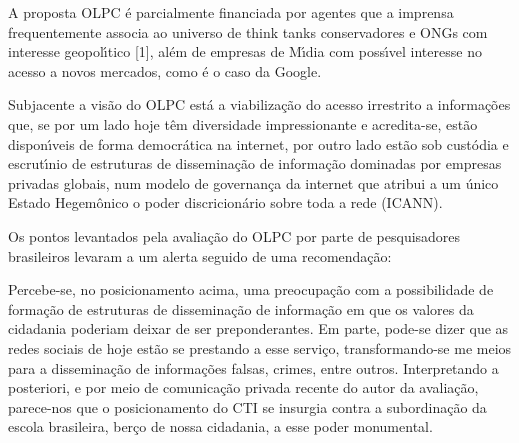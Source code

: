 \documentclass[
12pt,		%
openright,	%
twoside,  %
a4paper,			%
chapter=TITLE,		%
english,			%
french,				%
spanish,			%
brazil				%
]{USPSC-classe/USPSC}
\begin{document}
\begin{alineas}
\item \textquotedbl A proposta OLPC \'e parcialmente financiada por agentes que a imprensa frequentemente associa ao universo de think tanks conservadores e ONGs com interesse geopol\'{\i}tico [1], al\'em de empresas de M\'{\i}dia com poss\'{\i}vel interesse no acesso a novos mercados, como \'e o caso da Google.\textquotedbl 
\item \textquotedbl Subjacente a vis\~ao do OLPC est\'a a viabiliza\c{c}\~ao do acesso irrestrito a informa\c{c}\~oes que, se por um lado hoje t\^em diversidade impressionante e acredita-se, est\~ao dispon\'{\i}veis de forma democr\'atica na internet, por outro lado est\~ao sob cust\'odia e escrut\'{\i}nio de estruturas de dissemina\c{c}\~ao de informa\c{c}\~ao dominadas por empresas privadas globais, num modelo de governan\c{c}a da internet que atribui a um \'unico Estado Hegem\^onico o poder discricion\'ario sobre toda a rede (ICANN).\textquotedbl 
\end{alineas}

Os pontos levantados pela avalia\c{c}\~ao do OLPC por parte de pesquisadores brasileiros levaram a um alerta seguido de uma recomenda\c{c}\~ao:










\noindent\begin{center}\mbox{\centering{}}\end{center}


Percebe-se, no posicionamento acima, uma preocupa\c{c}\~ao com a possibilidade de forma\c{c}\~ao de estruturas de dissemina\c{c}\~ao de informa\c{c}\~ao em que os valores da cidadania poderiam deixar de ser preponderantes. Em parte, pode-se dizer que as redes sociais de hoje est\~ao se prestando a esse servi\c{c}o, transformando-se me meios para a dissemina\c{c}\~ao de informa\c{c}\~oes falsas, crimes, entre outros. Interpretando a posteriori, e por meio de comunica\c{c}\~ao privada recente do autor da avalia\c{c}\~ao, parece-nos que o posicionamento do CTI se insurgia contra a subordina\c{c}\~ao da escola brasileira, ber\c{c}o de nossa cidadania, a esse poder monumental.
\end{document}
